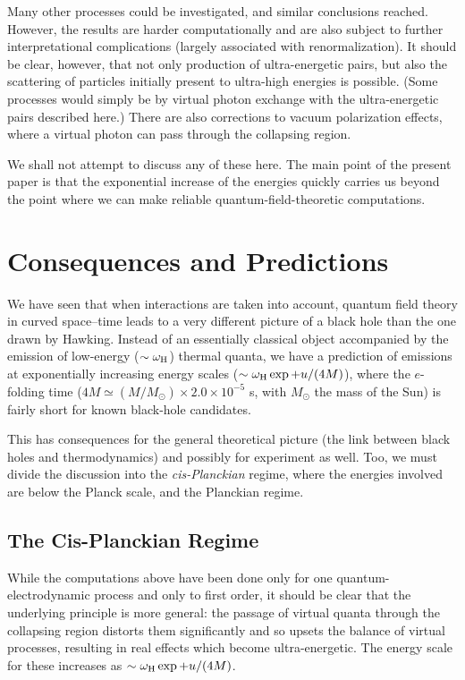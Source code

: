 \documentclass[12pt]{article}
\begin{document}
Many other processes could be investigated, and similar conclusions reached. 
However, the results are harder computationally and are also subject to further
interpretational complications (largely associated with renormalization).  It
should be clear, however, that not only production of ultra-energetic pairs, but
also the scattering of particles initially present to ultra-high energies is
possible.  (Some processes would simply be by virtual photon exchange with the
ultra-energetic pairs described here.)  There are also corrections to vacuum
polarization effects, where a virtual photon can pass through the collapsing
region.

We shall not attempt to discuss any of these here.  The main point of the
present paper is that the exponential increase of the energies quickly carries
us beyond the point where we can make reliable quantum-field-theoretic
computations.

\section{Consequences and Predictions}
\label{CP}

We have seen that when interactions are taken into account, quantum field
theory in curved space--time leads to a very different picture of a black hole
than the one drawn by Hawking.  Instead of an essentially classical object
accompanied by the emission of low-energy ($\sim\omega _{\rm H}$) thermal
quanta, we have a prediction of emissions at exponentially increasing energy
scales ($\sim \omega _{\rm H}\exp +u/(4M)$), where the $e$-folding time
($4M\simeq (M/M_\odot)\times 2.0\times 10^{-5}$ s, with $M_\odot$ the mass of
the Sun) is fairly short for known black-hole candidates.

This has consequences for the general theoretical picture (the link between
black holes and thermodynamics) and possibly for experiment as well.  Too, we
must divide the discussion into the {\em cis-Planckian} regime, where the
energies involved are below the Planck scale, and the Planckian regime.

\subsection{The Cis-Planckian Regime}

While the computations above have been done only for one quantum-electrodynamic
process and only to first order, it should be clear that the underlying
principle is more general:  the passage of virtual quanta through the
collapsing region distorts them significantly and so upsets the balance of
virtual processes, resulting in real  effects which become ultra-energetic. 
The energy scale for these increases as $\sim\omega _{\rm H}\exp +u/(4M)$. 
\end{document}
